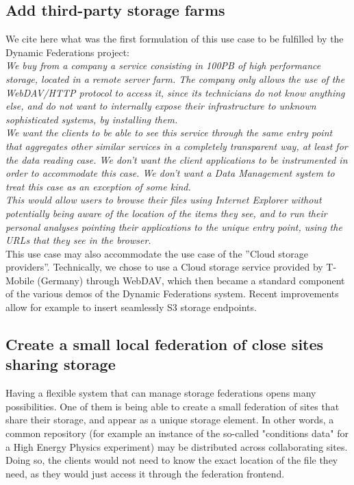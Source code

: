 \documentclass[12pt]{article} %
\begin{document}
\subsection{Add third-party storage farms}

We cite here what was the first formulation of this use case to be fulfilled by the Dynamic Federations project: \\
\textit{We buy from a company a service consisting in 100PB of high performance storage, located in a remote server farm. The company only allows the use of the WebDAV/HTTP protocol to access it, since its technicians do not know anything else, and do not want to internally expose their infrastructure to unknown sophisticated systems, by installing them.\\
We want the clients to be able to see this service through the same entry point that aggregates other similar services in a completely transparent way, at least for the data reading case. We don't want the client applications to be instrumented in order to accommodate this case. We don't want a Data Management system to treat this case as an exception of some kind.\\
This would allow users to browse their files using Internet Explorer without potentially being aware of the location of the items they see, and to run their personal analyses pointing their applications to the unique entry point, using the URLs that they see in the browser.}\\

This use case may also accommodate the use case of the ''Cloud storage providers''. Technically, we chose to use a Cloud storage service provided by T-Mobile (Germany) through WebDAV, which then became a standard component of the various demos of the Dynamic Federations system. Recent improvements allow for example to insert seamlessly S3 storage endpoints.

\subsection{Create a small local federation of close sites sharing storage}

Having a flexible system that can manage storage federations opens many possibilities. One of them is being able to create a small federation of sites that share their storage, and appear as a unique storage element. In other words, a common repository (for example an instance of the so-called "conditions data" for a High Energy Physics experiment) may be distributed across collaborating sites. Doing so, the clients would not  need to know the exact location of the file they need, as they would just access it through the federation frontend.
\end{document}
